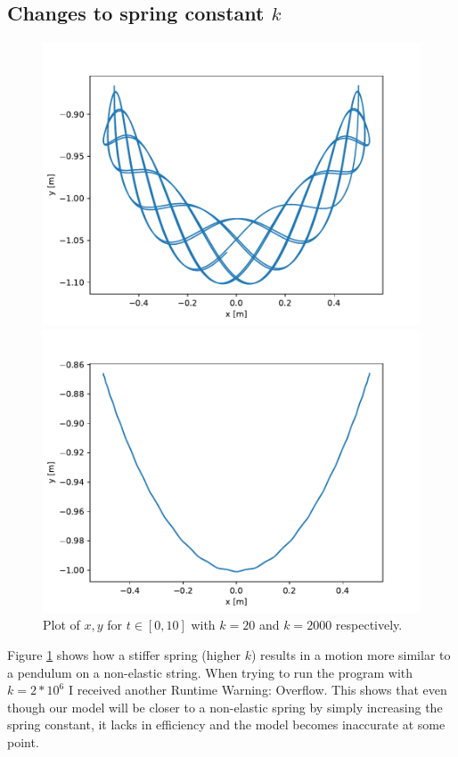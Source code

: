 \documentclass[a4paper,10pt,english]{article}
\begin{document}
\newpage
\subsection{Changes to spring constant $k$}
\begin{figure}[h]
    \centering
    \begin{minipage}{0.5\textwidth}
        \centering
        \includegraphics[width=1.05\textwidth]{k20.pdf} %
    \end{minipage}\hfill
    \begin{minipage}{0.5\textwidth}
        \centering
        \includegraphics[width=1.05\textwidth]{k2000.pdf} %
    \end{minipage}
    \caption{Plot of $x, y$ for $t\in[0, 10]$ with $k = 20$ and $k = 2000$ respectively.}
    \label{dt}
\end{figure}
Figure \ref{dt} shows how a stiffer spring (higher $k$) results in a motion more similar to a pendulum on a non-elastic string. When trying to run the program with $k=2*10^6$ I received another Runtime Warning: Overflow. This shows that even though our model will be closer to a non-elastic spring by simply increasing the spring constant, it lacks in efficiency and the model becomes inaccurate at some point. 
\end{document}
